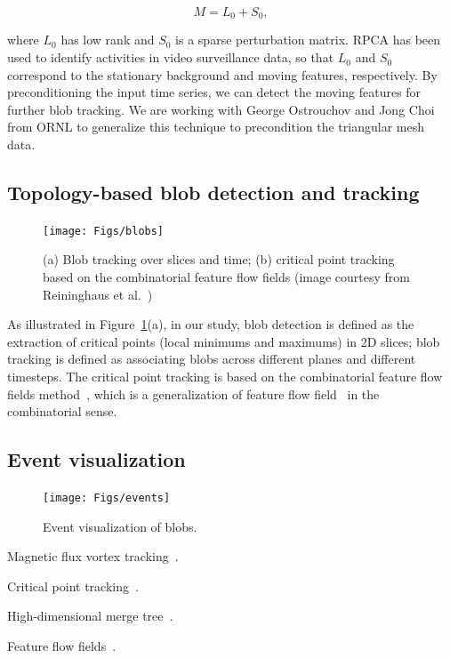 \begin{equation}
M = L_0 + S_0, 
\end{equation}

\noindent where $L_0$ has low rank and $S_0$ is a sparse perturbation matrix.  RPCA has been used to identify activities in video surveillance data, so that $L_0$ and $S_0$ correspond to the stationary background and moving features, respectively.  By preconditioning the input time series, we can detect the moving features for further blob tracking.  We are working with George Ostrouchov and Jong Choi from ORNL to generalize this technique to precondition the triangular mesh data.  


\subsection{Topology-based blob detection and tracking}

\begin{figure}[!h]
  \centering
  \texttt{[image: Figs/blobs]}
  \caption{(a) Blob tracking over slices and time; (b) critical point tracking based on the combinatorial feature flow fields (image courtesy from Reininghaus et al.~\cite{ReininghausKWH12})}
  \label{fig:blob}
\end{figure}


As illustrated in Figure~\ref{fig:blob}(a), in our study, blob detection is defined as the extraction of critical points (local minimums and maximums) in 2D slices; blob tracking is defined as associating blobs across different planes and different timesteps.  The critical point tracking is based on the combinatorial feature flow fields method~\cite{ReininghausKWH12}, which is a generalization of feature flow field~\cite{TheiselS03} in the combinatorial sense.  



\subsection{Event visualization}


\begin{figure}[!h]
  \centering
  \texttt{[image: Figs/events]}
  \caption{Event visualization of blobs.}
  \label{fig:events}
\end{figure}





Magnetic flux vortex tracking~\cite{GuoPPKG16, GuoPG17, PhillipsGPKG16, PhillipsPKG15}.

Critical point tracking~\cite{ReininghausKWH12}.

High-dimensional merge tree~\cite{OesterlingHWMS17}. 

Feature flow fields~\cite{TheiselS03}. 
